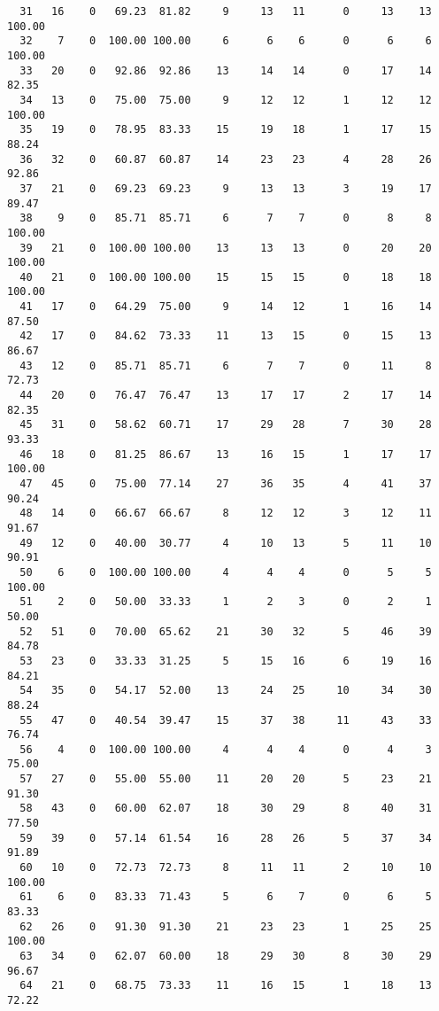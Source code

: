 \begin{verbatim}
  31   16    0   69.23  81.82     9     13   11      0     13    13   100.00
  32    7    0  100.00 100.00     6      6    6      0      6     6   100.00
  33   20    0   92.86  92.86    13     14   14      0     17    14    82.35
  34   13    0   75.00  75.00     9     12   12      1     12    12   100.00
  35   19    0   78.95  83.33    15     19   18      1     17    15    88.24
  36   32    0   60.87  60.87    14     23   23      4     28    26    92.86
  37   21    0   69.23  69.23     9     13   13      3     19    17    89.47
  38    9    0   85.71  85.71     6      7    7      0      8     8   100.00
  39   21    0  100.00 100.00    13     13   13      0     20    20   100.00
  40   21    0  100.00 100.00    15     15   15      0     18    18   100.00
  41   17    0   64.29  75.00     9     14   12      1     16    14    87.50
  42   17    0   84.62  73.33    11     13   15      0     15    13    86.67
  43   12    0   85.71  85.71     6      7    7      0     11     8    72.73
  44   20    0   76.47  76.47    13     17   17      2     17    14    82.35
  45   31    0   58.62  60.71    17     29   28      7     30    28    93.33
  46   18    0   81.25  86.67    13     16   15      1     17    17   100.00
  47   45    0   75.00  77.14    27     36   35      4     41    37    90.24
  48   14    0   66.67  66.67     8     12   12      3     12    11    91.67
  49   12    0   40.00  30.77     4     10   13      5     11    10    90.91
  50    6    0  100.00 100.00     4      4    4      0      5     5   100.00
  51    2    0   50.00  33.33     1      2    3      0      2     1    50.00
  52   51    0   70.00  65.62    21     30   32      5     46    39    84.78
  53   23    0   33.33  31.25     5     15   16      6     19    16    84.21
  54   35    0   54.17  52.00    13     24   25     10     34    30    88.24
  55   47    0   40.54  39.47    15     37   38     11     43    33    76.74
  56    4    0  100.00 100.00     4      4    4      0      4     3    75.00
  57   27    0   55.00  55.00    11     20   20      5     23    21    91.30
  58   43    0   60.00  62.07    18     30   29      8     40    31    77.50
  59   39    0   57.14  61.54    16     28   26      5     37    34    91.89
  60   10    0   72.73  72.73     8     11   11      2     10    10   100.00
  61    6    0   83.33  71.43     5      6    7      0      6     5    83.33
  62   26    0   91.30  91.30    21     23   23      1     25    25   100.00
  63   34    0   62.07  60.00    18     29   30      8     30    29    96.67
  64   21    0   68.75  73.33    11     16   15      1     18    13    72.22

\end{verbatim}
